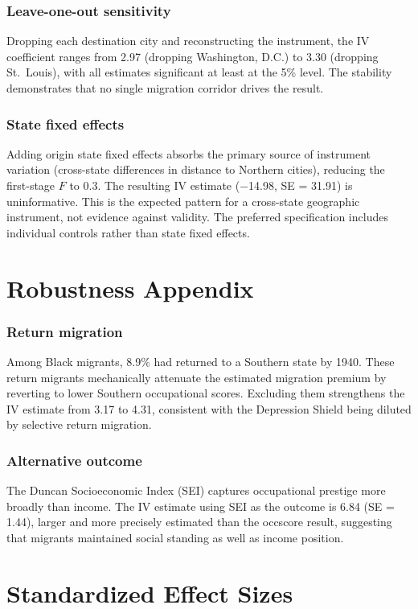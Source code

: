 \documentclass[12pt]{article}
\begin{document}
\subsubsection*{Leave-one-out sensitivity} Dropping each destination city and reconstructing the instrument, the IV coefficient ranges from 2.97 (dropping Washington, D.C.) to 3.30 (dropping St.\ Louis), with all estimates significant at least at the 5\% level. The stability demonstrates that no single migration corridor drives the result.

\subsubsection*{State fixed effects} Adding origin state fixed effects absorbs the primary source of instrument variation (cross-state differences in distance to Northern cities), reducing the first-stage $F$ to 0.3. The resulting IV estimate ($-$14.98, SE = 31.91) is uninformative. This is the expected pattern for a cross-state geographic instrument, not evidence against validity. The preferred specification includes individual controls rather than state fixed effects.

\section{Robustness Appendix}

\subsubsection*{Return migration} Among Black migrants, 8.9\% had returned to a Southern state by 1940. These return migrants mechanically attenuate the estimated migration premium by reverting to lower Southern occupational scores. Excluding them strengthens the IV estimate from 3.17 to 4.31, consistent with the Depression Shield being diluted by selective return migration.

\subsubsection*{Alternative outcome} The Duncan Socioeconomic Index (SEI) captures occupational prestige more broadly than income. The IV estimate using SEI as the outcome is 6.84 (SE = 1.44), larger and more precisely estimated than the occscore result, suggesting that migrants maintained social standing as well as income position.

\section{Standardized Effect Sizes}
\label{sec:sde}


\end{document}
